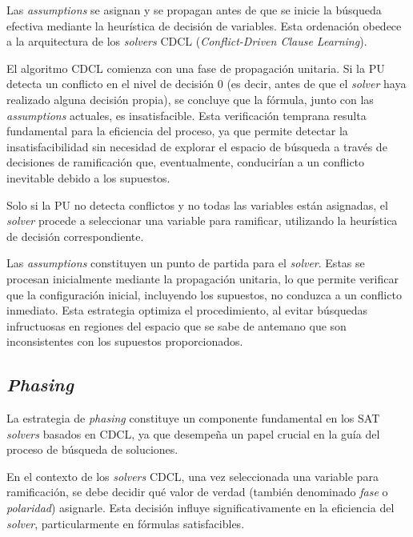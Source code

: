 
Las \textit{assumptions} se asignan y se propagan antes de que se inicie la búsqueda efectiva mediante la heurística de decisión de variables. Esta ordenación obedece a la arquitectura de los \textit{solvers} CDCL (\textit{Conflict-Driven Clause Learning}). %

El algoritmo CDCL comienza con una fase de propagación unitaria. Si la PU detecta un conflicto en el nivel de decisión 0 (es decir, antes de que el \textit{solver} haya realizado alguna decisión propia), se concluye que la fórmula, junto con las \textit{assumptions} actuales, es insatisfacible. %
Esta verificación temprana resulta fundamental para la eficiencia del proceso, ya que permite detectar la insatisfacibilidad sin necesidad de explorar el espacio de búsqueda a través de decisiones de ramificación que, eventualmente, conducirían a un conflicto inevitable debido a los supuestos. %

Solo si la PU no detecta conflictos y no todas las variables están asignadas, el \textit{solver} procede a seleccionar una variable para ramificar, utilizando la heurística de decisión correspondiente. %

Las \textit{assumptions} constituyen un punto de partida para el \textit{solver}. Estas se procesan inicialmente mediante la propagación unitaria, lo que permite verificar que la configuración inicial, incluyendo los supuestos, no conduzca a un conflicto inmediato. Esta estrategia optimiza el procedimiento, al evitar búsquedas infructuosas en regiones del espacio que se sabe de antemano que son inconsistentes con los supuestos proporcionados.

\subsection{\textit{Phasing}}
\label{subsec:cadical-phasing}
La estrategia de \textit{phasing} constituye un componente fundamental en los SAT \textit{solvers} basados en CDCL, ya que desempeña un papel crucial en la guía del proceso de búsqueda de soluciones.

En el contexto de los \textit{solvers} CDCL, una vez seleccionada una variable para ramificación, se debe decidir qué valor de verdad (también denominado \textit{fase} o \textit{polaridad}) asignarle. Esta decisión influye significativamente en la eficiencia del \textit{solver}, particularmente en fórmulas satisfacibles.

